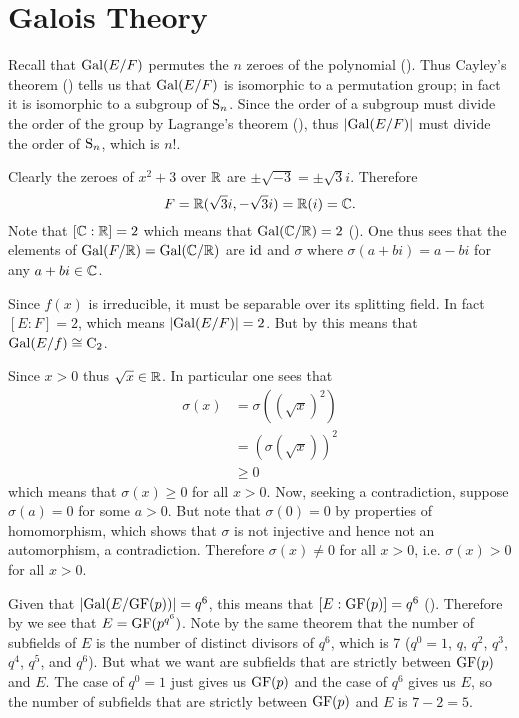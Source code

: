 \section{Galois Theory}
\begin{questions}
    \item Recall that $\mathrm{Gal}(E/F)$ permutes the $n$ zeroes of the polynomial (). Thus Cayley's theorem () tells us that $\mathrm{Gal}(E/F)$ is isomorphic to a permutation group; in fact it is isomorphic to a subgroup of $\mathrm{S}_{n}$. Since the order of a subgroup must divide the order of the group by Lagrange's theorem (), thus $|\mathrm{Gal}(E/F)|$ must divide the order of $\mathrm{S}_{n}$, which is $n!$.

    \item Clearly the zeroes of $x^2 + 3$ over $\mathbb{R}$ are $\pm\sqrt{-3} = \pm\sqrt3i$. Therefore
    \[
        F = \mathbb{R}(\sqrt3i, -\sqrt3i) = \mathbb{R}(i) = \mathbb{C}.
    \]
    Note that $[\mathbb{C}:\mathbb{R}] = 2$ which means that $\mathrm{Gal}(\mathbb{C}/\mathbb{R}) = 2$ (). One thus sees that the elements of $\mathrm{Gal}(F/\mathbb{R}) = \mathrm{Gal}(\mathbb{C}/\mathbb{R})$ are $\mathrm{id}$ and $\sigma$ where $\sigma(a + bi) = a - bi$ for any $a + bi \in \mathbb{C}$.

    \item Since $f(x)$ is irreducible, it must be separable over its splitting field. In fact $[E:F] = 2$, which means $|\mathrm{Gal}(E/F)| = 2$. But by  this means that $\mathrm{Gal}(E/f) \cong \mathrm{C}_{2}$.

    \item Since $x > 0$ thus $\sqrt x \in \mathbb{R}$. In particular one sees that
    \begin{align*}
        \sigma(x) &= \sigma\left((\sqrt x)^2\right)\\
        &= \left(\sigma(\sqrt x)\right)^2\\
        &\geq 0
    \end{align*}
    which means that $\sigma(x) \geq 0$ for all $x > 0$. Now, seeking a contradiction, suppose $\sigma(a) = 0$ for some $a > 0$. But note that $\sigma(0) = 0$ by properties of homomorphism, which shows that $\sigma$ is not injective and hence not an automorphism, a contradiction. Therefore $\sigma(x) \neq 0$ for all $x > 0$, i.e. $\sigma(x) > 0$ for all $x > 0$.

    \item Given that $|\mathrm{Gal}(E/\mathrm{GF}(p))| = q^6$, this means that $[E:\mathrm{GF}(p)] = q^6$ (). Therefore by  we see that $E = \mathrm{GF}(p^{q^6})$. Note by the same theorem that the number of subfields of $E$ is the number of distinct divisors of $q^6$, which is 7 ($q^0 = 1$, $q$, $q^2$, $q^3$, $q^4$, $q^5$, and $q^6$). But what we want are subfields that are strictly between $\mathrm{GF}(p)$ and $E$. The case of $q^0 = 1$ just gives us $\mathrm{GF}(p)$ and the case of $q^6$ gives us $E$, so the number of subfields that are strictly between $\mathrm{GF}(p)$ and $E$ is $7 - 2 = 5$.


\end{questions}
